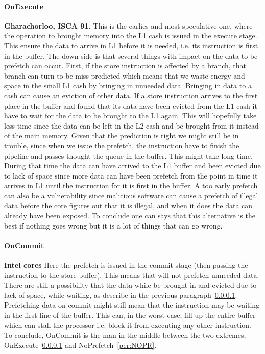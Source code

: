 \paragraph{OnExecute}\label{per:ONEX} \textbf{Gharachorloo, ISCA 91.} This is the earlies and most speculative one, where the operation to brought memory into the L1 cash is issued in the execute stage. This ensure the data to arrive in L1 before it is needed, i.e. its instruction is first in the buffer. The down side is that several things with impact on the data to be prefetch can occur. First, if the store instruction is affected by a branch, that branch can turn to be miss predicted which means that we waste energy and space in the small L1 cash by bringing in unneeded data. Bringing in data to a cash can cause an eviction of other data. If a store instruction arrives to the first place in the buffer and found that its data have been evicted from the L1 cash it have to wait for the data to be brought to the L1 again. This will hopefully take less time since the data can be left in the L2 cash and be brought from it instead of the main memory. Given that the prediction is right we might still be in trouble, since when we issue the prefetch, the instruction have to finish the pipeline and passes thought the queue in the buffer. This might take long time. During that time the data can have arrived to the L1 buffer and been evicted due to lack of space since more data can have been prefetch from the point in time it arrives in L1 until the instruction for it is first in the buffer. A too early prefetch can also be a vulnerability since malicious software can cause a prefetch of illegal data before the core figures out that it is illegal, and when it does the data can already have been exposed. To conclude one can says that this alternative is the best if nothing goes wrong but it is a lot of things that can go wrong.

\paragraph{OnCommit} \label{per:ONCO} \textbf{Intel cores} Here the prefetch is issued in the commit stage (then passing the instruction to the store buffer). This means that will not prefetch unneeded data. There are still a possibility that the data while be brought in and evicted due to lack of space, while waiting, as describe in the previous paragraph~\ref{per:ONEX}. Prefetching data on commit might still mean that the instruction may be waiting in the first line of the buffer. This can, in the worst case, fill up the entire buffer which can stall the processor i.e. block it from executing any other instruction. To conclude, OnCommit is the man in the middle between the two extremes, OnExecute~\ref{per:ONEX} and NoPrefetch~\ref{per:NOPR}.

